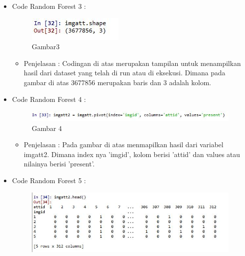 \begin{enumerate}
\begin{itemize}
\begin{itemize}
\begin{itemize}
\begin{itemize}
\par
\par
\end{itemize}
\item Code Random Forest 3 :
\par
\begin{figure}[ht]
\centering
\includegraphics[scale=0.7]{figures/cod3.jpg}
\caption{Gambar3}
\label{contoh}
\end{figure}
\par
\begin{itemize}
\item Penjelasan : Codingan di atas merupakan tampilan untuk menampilkan hasil dari dataset yang telah di run atau di eksekusi. Dimana pada gambar di atas 3677856 merupakan baris dan 3 adalah kolom.
\par
\par
\end{itemize}
\item Code Random Forest 4 :
\par
\begin{figure}[ht]
\centering
\includegraphics[scale=0.7]{figures/cod4.jpg}
\caption{Gambar 4}
\label{contoh}
\end{figure}
\par
\begin{itemize}
\item Penjelasan : Pada gambar di atas menmapilkan hasil dari variabel imgatt2. Dimana index nya 'imgid', kolom berisi 'attid' dan values atau nilainya berisi 'present'.
\par
\par
\end{itemize}
\item Code Random Forest 5 :
\par
\begin{figure}[ht]
\centering
\includegraphics[scale=0.7]{figures/cod5.jpg}

\end{figure}
\end{itemize}
\end{itemize}
\end{itemize}
\end{enumerate}
